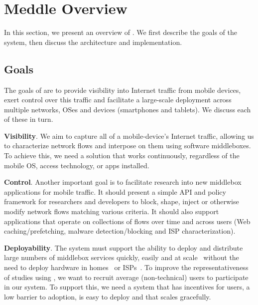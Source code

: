 \section{Meddle Overview}
\label{sec:goals}

In this section, we present an overview of \meddle. We first describe the goals of the 
system, then discuss the \meddle architecture and implementation. 


\subsection{Goals}

The goals of \meddle are to provide visibility into Internet traffic from mobile devices, 
exert control over this traffic and facilitate a large-scale deployment across multiple 
networks, OSes and devices (smartphones and tablets). We discuss each of these in turn.

\noindent\textbf{Visibility}. We aim to capture all of a mobile-device's Internet traffic,
allowing us to characterize network flows and interpose on them using software middleboxes. 
To achieve this, we need a solution that works continuously, regardless of the mobile OS, access 
technology, or apps installed. %
  
\noindent\textbf{Control}. Another important goal is to facilitate research into new middlebox 
applications for mobile traffic. 
It should present a simple API and policy framework for researchers and developers to block, shape, 
inject or otherwise modify network flows matching various criteria. It should also support applications that operate on collections of flows over 
time and across users (\eg Web caching/prefetching, malware detection/blocking and ISP characterization). 


\noindent\textbf{Deployability}. The system must support the ability to deploy and distribute large numbers 
of middlebox services quickly, easily and at scale~\cite{sherry:middleboxes} without 
the need to deploy hardware in homes~\cite{bismark} or ISPs~\cite{wang:middleboxes}. 
To improve the representativeness of studies using \meddle, we want to 
recruit average (\ie non-technical) users to participate in our system. To support this, we need a system 
that has incentives for users, a low barrier to adoption, is easy to deploy and that scales gracefully. 


